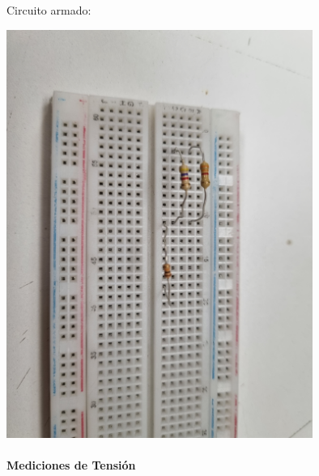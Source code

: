 \documentclass[a4paper,12pt]{article}
\begin{document}
Circuito armado:

\includegraphics[width=10cm]{imagenes/proto.jpg}\\[0.5cm]

\paragraph{Mediciones de Tensión}
\paragraph{}
\end{document}
